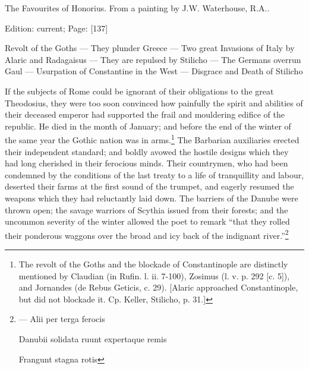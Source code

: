 The Favourites of Honorius. From a painting by J.W. Waterhouse, R.A..

Edition: current; Page: [137]


Revolt of the Goths \texthebrew{—} They plunder Greece \texthebrew{—} Two great Invasions of Italy by Alaric and Radagaisus \texthebrew{—} They are repulsed by Stilicho \texthebrew{—} The Germans overrun Gaul \texthebrew{—} Usurpation of Constantine in the West \texthebrew{—} Disgrace and Death of Stilicho

If the subjects of Rome could be ignorant of their obligations to the great Theodosius, they were too soon convinced how painfully the spirit and abilities of their deceased emperor had supported the frail and mouldering edifice of the republic. He died in the month of January; and before the end of the winter of the same year the Gothic nation was in arms.\footnote{The revolt of the Goths and the blockade of Constantinople are distinctly mentioned by Claudian (in Rufin. l. ii. 7-100), Zosimus (l. v. p. 292 [c. 5]), and Jornandes (de Rebus Geticis, c. 29). [Alaric approached Constantinople, but did not blockade it. Cp. Keller, Stilicho, p. 31.]} The Barbarian auxiliaries erected their independent standard; and boldly avowed the hostile designs which they had long cherished in their ferocious minds. Their countrymen, who had been condemned by the conditions of the last treaty to a life of tranquillity and labour, deserted their farms at the first sound of the trumpet, and eagerly resumed the weapons which they had reluctantly laid down. The barriers of the Danube were thrown open; the savage warriors of Scythia issued from their forests; and the uncommon severity of the winter allowed the poet to remark \texthebrew{“}that they rolled their ponderous waggons over the broad and icy back of the indignant river.\texthebrew{}”\footnote{\texthebrew{—} Alii per terga ferocis

Danubii solidata ruunt expertaque remis

Frangunt stagna rotis

}
